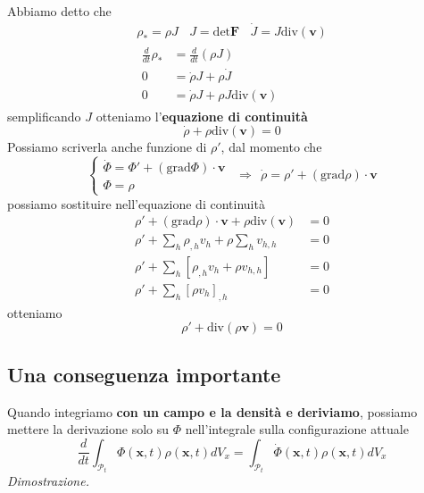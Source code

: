 \documentclass[10pt,a4paper,twoside]{book}
\begin{document}
Abbiamo detto che
\begin{gather*}
\rho _{*} =\rho J\ \ \ \ J=\mathrm{det}\mathbf{F} \ \ \ \ \dot{J} =J\mathrm{div}(\mathbf{v})\\
\begin{aligned}
\frac{d}{dt} \rho _{*} & =\frac{d}{dt}( \rho J)\\
0 & =\dot{\rho } J+\rho \dot{J}\\
0 & =\dot{\rho } J+\rho J\mathrm{div}(\mathbf{v})
\end{aligned}
\end{gather*}
semplificando $J$ otteniamo l'\textbf{equazione di continuità}
\begin{equation*}
\boxed{\dot{\rho } +\rho \mathrm{div}(\mathbf{v}) =0}
\end{equation*}
Possiamo scriverla anche funzione di $\rho '$, dal momento che
\begin{equation*}
\begin{cases}
\dot{\Phi } =\Phi '+(\mathrm{grad} \Phi ) \cdotp \mathbf{v}\\
\Phi =\rho 
\end{cases} \ \ \Rightarrow \ \ \dot{\rho } =\rho '+(\mathrm{grad} \rho ) \cdotp \mathbf{v}
\end{equation*}
possiamo sostituire nell'equazione di continuità
\begin{equation*}
\begin{aligned}
\rho '+(\mathrm{grad} \rho ) \cdotp \mathbf{v} +\rho \mathrm{div}(\mathbf{v}) & =0\\
\rho '+\sum\limits _{h} \rho _{,h} v_{h} +\rho \sum _{h} v_{h,h} & =0\\
\rho '+\sum\limits _{h}[ \rho _{,h} v_{h} +\rho v_{h,h}] & =0\\
\rho '+\sum\limits _{h}[ \rho v_{h}]_{,h} & =0
\end{aligned}
\end{equation*}
otteniamo
\begin{equation*}
\boxed{\rho '+\mathrm{div}( \rho \mathbf{v}) =0}
\end{equation*}
\subsection{Una conseguenza importante}

Quando integriamo \textbf{con un campo e la densità e deriviamo}, possiamo mettere la derivazione solo su $\Phi $ nell'integrale sulla configurazione attuale
\begin{equation*}
\boxed{\frac{d}{dt}\int _{\mathcal{P}_{t}} \Phi (\mathbf{x} ,t) \rho (\mathbf{x} ,t) dV_{x} =\int _{\mathcal{P}_{t}}\dot{\Phi }(\mathbf{x} ,t) \rho (\mathbf{x} ,t) dV_{x}}
\end{equation*}
\textit{Dimostrazione.}
\end{document}
